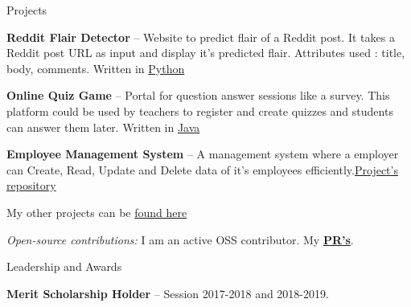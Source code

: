 \documentclass{resume} %
\begin{document}
\begin{rSection}{Projects}
  \begin{rProjectSection}
    \item \textbf {Reddit Flair Detector} -- Website to predict flair of a Reddit post. It takes a Reddit post URL as input and display it's predicted flair. Attributes used : title, body, comments. Written in \href{https://github.com/siddhi523/reddit_flair_detector_}{Python}
    \vspace{3mm}
    \item \textbf {Online Quiz Game} --  Portal for question answer sessions like a survey. This platform could be used by teachers to register and create quizzes and students can answer them later. Written in \href{https://github.com/siddhi523/Online_Quiz_Game}{Java}
    \vspace{3mm}
    \item \textbf {Employee Management System} -- A management system where a employer can Create, Read, Update and Delete data of it's employees efficiently.\href{https://www.semanticscholar.org/paper/Empirical-Analysis-of-Cervical-and-Breast-Cancer-Kaur-Pruthi/28fd7fd826460167a685b29cf3f56cfe83da1cb6}{Project's repository}
    \vspace{3mm}
    \item My other projects can be \href{https://github.com/siddhi523?tab=repositories}{found here}
  \end{rProjectSection}

  \begin{rBlurbSection}
    \item {\em Open-source contributions:}
      I am an active OSS contributor. My \href{https://github.com/pulls}{\textbf{PR's}}.
  \end{rBlurbSection}
\end{rSection}


\begin{rSection}{Leadership and Awards}
  \begin{rProjectSection}
    \item \textbf {Merit Scholarship Holder} -- Session 2017-2018 and 2018-2019.
  \end{rProjectSection}
\end{rSection}


\end{document}
